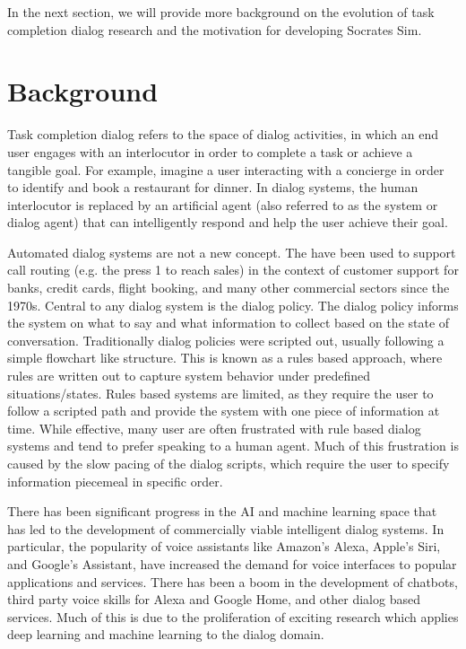 In the next section, we will provide more background on the evolution of task completion dialog research and the motivation for developing Socrates Sim. 

\section{Background}

Task completion dialog refers to the space of dialog activities, in which an end user engages with an interlocutor in order to complete a task or achieve a tangible goal. For example, imagine a user interacting with a concierge in order to identify and book a restaurant for dinner. In dialog systems, the human interlocutor is replaced by an artificial agent (also referred to as the system or dialog agent) that can intelligently respond and help the user achieve their goal.

Automated dialog systems are not a new concept. The have been used to support call routing (e.g. the press 1 to reach sales) in the context of customer support for banks, credit cards, flight booking, and many other commercial sectors since the 1970s. Central to any dialog system is the dialog policy. The dialog policy informs the system on what to say and what information to collect based on the state of conversation. Traditionally dialog policies were scripted out, usually following a simple flowchart like structure. This is known as a rules based approach, where rules are written out to capture system behavior under predefined situations/states. Rules based systems are limited, as they require the user to follow a scripted path and provide the system with one piece of information at time. While effective, many user are often frustrated with rule based dialog systems and tend to prefer speaking to a human agent. Much of this frustration is caused by the slow pacing of the dialog scripts, which require the user to specify information piecemeal in specific order. 

There has been significant progress in the AI and machine learning space that has led to the development of commercially viable intelligent dialog systems. In particular, the popularity of voice assistants like Amazon’s Alexa, Apple’s Siri, and Google's Assistant, have increased the demand for voice interfaces to popular applications and services. There has been a boom in the development of chatbots, third party voice skills for Alexa and Google Home, and other dialog based services. Much of this is due to the proliferation of exciting research which applies deep learning and machine learning to the dialog domain. 

